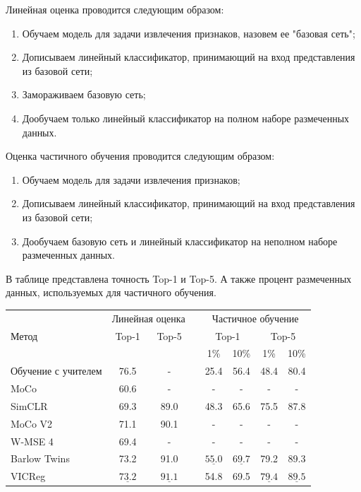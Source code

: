 Линейная оценка проводится следующим образом:
\begin{enumerate}
    \item Обучаем модель для задачи извлечения признаков, назовем ее "базовая сеть";
    \item Дописываем линейный классификатор, принимающий на вход представления из базовой сети;
    \item Замораживаем базовую сеть;
    \item Дообучаем только линейный классификатор на полном наборе размеченных данных.
\end{enumerate} 

Оценка частичного обучения проводится следующим образом:
\begin{enumerate}
    \item Обучаем модель для задачи извлечения признаков;
    \item Дописываем линейный классификатор, принимающий на вход представления из базовой сети;
    \item Дообучаем базовую сеть и линейный классификатор на неполном наборе размеченных данных.
\end{enumerate} 

В таблице представлена точность Top-1 и Top-5. А также процент размеченных данных, используемых для частичного обучения.

\begin{center}
\begin{tabular}{ l c c c c c c c } 
  \hline
  \multirow{3}{4em}{Метод} & \multicolumn{2}{c}{Линейная оценка} & & \multicolumn{4}{c}{Частичное обучение} \\
  \cline{2-3}\cline{5-8}
  
  & Top-1 & Top-5 & &  \multicolumn{2}{c}{Top-1} &  \multicolumn{2}{c}{Top-5}  \\ 
  & & & & 1\% & 10\% & 1\% & 10\% \\ 
  \hline
  
  Обучение с учителем & 76.5 & - & & 25.4 & 56.4 & 48.4 & 80.4 \\
  \hline

  MoCo \cite{MoCo} & 60.6 & - & & - & - & - & - \\
  SimCLR \cite{SimCLR} & 69.3 & 89.0 & & 48.3 & 65.6 & 75.5 & 87.8 \\
  MoCo V2 \cite{MoCo_V2} & 71.1 & 90.1 & & - & - & - & - \\
  W-MSE 4 \cite{Whitening_MSE} & 69.4 & - & & - & - & - & - \\
  Barlow Twins \cite{Barlow_Twins} & 73.2 & 91.0 & & $\underline{55.0}$ & $\underline{69.7}$ & 79.2 & 89.3 \\
  VICReg \cite{Vicreg} & $\underline{73.2}$ & $\underline{91.1}$ & & 54.8 & 69.5 & $\underline{79.4}$ & $\underline{89.5}$ \\
  
  \hline
\end{tabular}
\end{center}

